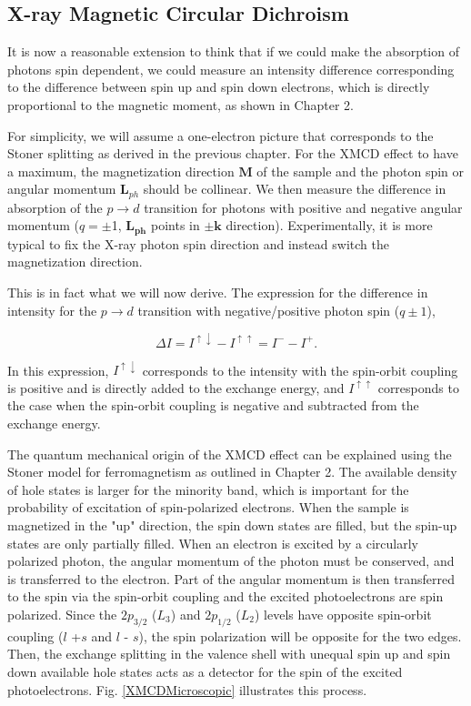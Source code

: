 \subsection{X-ray Magnetic Circular Dichroism}

It is now a reasonable extension to think that if we could make the absorption of photons spin dependent, we could measure an intensity difference corresponding to the difference between spin up and spin down electrons, which is directly proportional to the magnetic moment, as shown in Chapter 2.

For simplicity, we will assume a one-electron picture that corresponds to the Stoner splitting as derived in the previous chapter. For the XMCD effect to have a maximum, the magnetization direction $\pmb{M}$ of the sample and the photon spin or angular momentum $\pmb{L}_{ph}$ should be collinear. We then measure the difference in absorption of the $p \rightarrow d$ transition for photons with positive and negative angular momentum ($q = \pm$1, $\pmb{L_{ph}}$ points in $\pm\pmb{k}$ direction). Experimentally, it is more typical to fix the X-ray photon spin direction and instead switch the magnetization direction.

This is in fact what we will now derive. The expression for the difference in intensity for the $p\rightarrow d$ transition with negative/positive photon spin ($q\pm 1$),

\begin{equation}
\Delta I = I^{\uparrow \downarrow} - I^{\uparrow \uparrow} = I^- - I^+.
\end{equation}

In this expression, $I^{\uparrow \downarrow}$ corresponds to the intensity with the spin-orbit coupling is positive and is directly added to the exchange energy, and $I^{\uparrow \uparrow}$ corresponds to the case when the spin-orbit coupling is negative and subtracted from the exchange energy.

The quantum mechanical origin of the XMCD effect can be explained using the Stoner model for ferromagnetism as outlined in Chapter 2. The available density of hole states is larger for the minority band, which is important for the probability of excitation of spin-polarized electrons. When the sample is magnetized in the "up" direction, the spin down states are filled, but the spin-up states are only partially filled. When an electron is excited by a circularly polarized photon, the angular momentum of the photon must be conserved, and is transferred to the electron. Part of the angular momentum is then transferred to the spin via the spin-orbit coupling and the excited photoelectrons are spin polarized. Since the $2p_{3/2}$ ($L_3$) and $2p_{1/2}$ ($L_2$) levels have opposite spin-orbit coupling ($l$ +$s$ and $l$ - $s$), the spin polarization will be opposite for the two edges. Then, the exchange splitting in the valence shell with unequal spin up and spin down available hole states acts as a detector for the spin of the excited photoelectrons. Fig. \ref{XMCDMicroscopic} illustrates this process.

